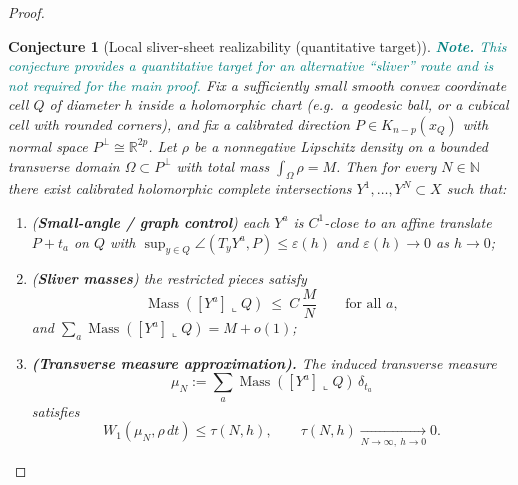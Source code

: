 \documentclass[11pt]{article}
\newcommand{\REVMZ}[1]{\textcolor{teal}{#1}}  %
\numberwithin{equation}{section}  %
\theoremstyle{plain}
\newtheorem{conjecture}[theorem]{Conjecture}
\theoremstyle{definition}
\theoremstyle{remark}
\newcommand{\R}{\mathbb{R}}
\newcommand{\N}{\mathbb{N}}
\DeclareMathOperator{\Mass}{Mass}
\begin{document}
\begin{proof}
\begin{conjecture}[Local sliver-sheet realizability (quantitative target)]\label{conj:sliver-local}
\REVMZ{\textbf{Note.} This conjecture provides a quantitative target for an alternative ``sliver'' route and is not required for the main proof.}
\smallskip
Fix a sufficiently small \emph{smooth convex} coordinate cell $Q$ of diameter $h$ inside a holomorphic chart
(e.g.\ a geodesic ball, or a cubical cell with rounded corners), and fix a calibrated direction
$P\in K_{n-p}(x_Q)$ with normal space $P^\perp\cong\R^{2p}$.
Let $\rho$ be a nonnegative Lipschitz density on a bounded transverse domain $\Omega\subset P^\perp$ with total mass
$\int_\Omega \rho = M$.
Then for every $N\in\N$ there exist \emph{calibrated} holomorphic complete intersections
$Y^1,\dots,Y^N\subset X$ such that:
\begin{enumerate}
\item[\textnormal{(i)}] (\textbf{Small-angle / graph control}) each $Y^a$ is $C^1$-close to an affine translate $P+t_a$ on $Q$
with $\sup_{y\in Q}\angle(T_yY^a,P)\le \varepsilon(h)$ and $\varepsilon(h)\to 0$ as $h\to 0$;
\item[\textnormal{(ii)}] (\textbf{Sliver masses}) the restricted pieces satisfy
\[
\Mass([Y^a]\llcorner Q)\ \le\ C\,\frac{M}{N}
\qquad\text{for all }a,
\]
and $\sum_a \Mass([Y^a]\llcorner Q)=M+o(1)$;
\item[\textnormal{(iii)}] \textbf{(Transverse measure approximation).}
The induced transverse measure
\[
\mu_N:=\sum_a \Mass([Y^a]\llcorner Q)\,\delta_{t_a}
\]
satisfies
\[
W_1(\mu_N,\rho\,dt)\le \tau(N,h),
\qquad
\tau(N,h)\xrightarrow[N\to\infty,\ h\to 0]{}0 .
\]

\end{enumerate}
\end{conjecture}


\end{proof}
\end{document}
